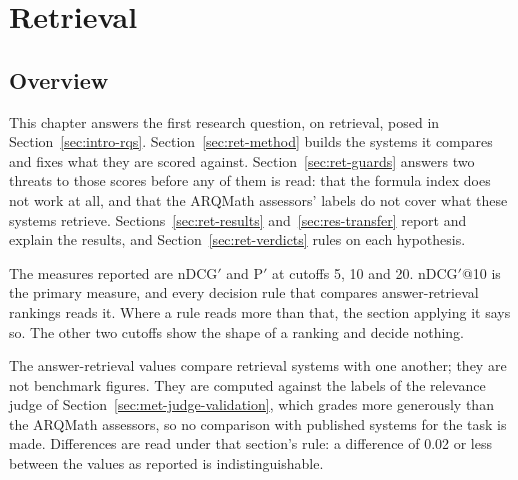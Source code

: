 \chapter{Retrieval}\label{ch:retrieval}


\section{Overview}\label{sec:ret-overview}

This chapter answers the first research question, on retrieval, posed in
Section~\ref{sec:intro-rqs}. Section~\ref{sec:ret-method} builds the systems it compares and
fixes what they are scored against. Section~\ref{sec:ret-guards} answers two threats to those
scores before any of them is read: that the formula index does not work at all, and that the
ARQMath assessors' labels do not cover what these systems retrieve.
Sections~\ref{sec:ret-results} and~\ref{sec:res-transfer} report and explain the results, and
Section~\ref{sec:ret-verdicts} rules on each hypothesis.

The measures reported are nDCG$'$ and P$'$ at cutoffs 5, 10 and 20. nDCG$'$@10 is the primary
measure, and every decision rule that compares answer-retrieval rankings reads it. Where a rule
reads more than that, the section applying it says so. The other two cutoffs show the shape of a
ranking and decide nothing.

The answer-retrieval values compare retrieval systems with one another; they are not benchmark
figures. They are computed against the labels of the relevance judge of
Section~\ref{sec:met-judge-validation}, which grades more generously than the ARQMath assessors,
so no comparison with published systems for the task is made. Differences are read under that
section's rule: a difference of 0.02 or less between the values as reported is indistinguishable.


